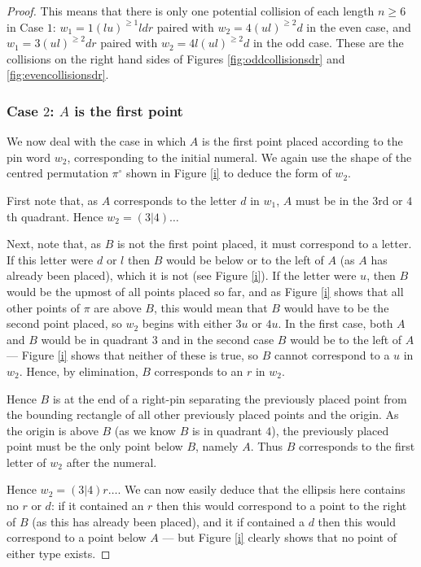 \documentclass[11pt,a4paper]{article}
\theoremstyle{definition}
\begin{document}
\begin{proof}
This means that there is only one potential collision of each length $n \geq 6$ in Case $1$: $w_{1} = 1(lu)^{\geq1}ldr$ paired with $w_{2} = 4(ul)^{\geq2}d$ in the even case, and $w_{1} = 3(ul)^{\geq2}dr$ paired with $w_{2} = 4l(ul)^{\geq2}d$ in the odd case. These are the collisions on the right hand sides of Figures \ref{fig:oddcollisionsdr} and \ref{fig:evencollisionsdr}.

\subsubsection*{Case $2$: $A$ is the first point}

We now deal with the case in which $A$ is the first point placed according to the pin word $w_{2}$, corresponding to the initial numeral. We again use the shape of the centred permutation $\pi^{\circ}$ shown in Figure \ref{i} to deduce the form of $w_{2}$.

First note that, as $A$ corresponds to the letter $d$ in $w_{1}$, $A$ must be in the $3$rd or $4$th quadrant. Hence $w_{2} = (3|4)\dots$

Next, note that, as $B$ is not the first point placed, it must correspond to a letter. If this letter were $d$ or $l$ then $B$ would be below or to the left of $A$ (as $A$ has already been placed), which it is not (see Figure \ref{i}). If the letter were $u$, then $B$ would be the upmost of all points placed so far, and as Figure \ref{i} shows that all other points of $\pi$ are above $B$, this would mean that $B$ would have to be the second point placed, so $w_{2}$ begins with either $3u$ or $4u$. In the first case, both $A$ and $B$ would be in quadrant $3$ and in the second case $B$ would be to the left of $A$ --- Figure \ref{i} shows that neither of these is true, so $B$ cannot correspond to a $u$ in $w_{2}$. Hence, by elimination, $B$ corresponds to an $r$ in $w_{2}$.

Hence $B$ is at the end of a right-pin separating the previously placed point from the bounding rectangle of all other previously placed points and the origin. As the origin is above $B$ (as we know $B$ is in quadrant $4$), the previously placed point must be the only point below $B$, namely $A$. Thus $B$ corresponds to the first letter of $w_{2}$ after the numeral.

Hence $w_{2}=(3|4)r\dots $. We can now easily deduce that the ellipsis here contains no $r$ or $d$: if it contained an $r$ then this would correspond to a point to the right of $B$ (as this has already been placed), and it if contained a $d$ then this would correspond to a point below $A$ --- but Figure \ref{i} clearly shows that no point of either type exists.


\end{proof}
\end{document}
